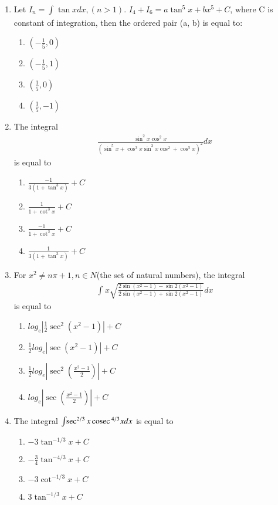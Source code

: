 \begin{enumerate}[label=\arabic*.,ref=\thesubsection.\theenumi]
\item Let $I_n = \int_{}\tan xdx,(n > 1)$. $I_4 + I_6 = a\tan^{5}x + bx^5 + C$, where C is constant of integration, then the ordered pair (a, b) is equal to:
\begin{enumerate}
\item $(-\frac{1}{5}, 0)$
\item $(-\frac{1}{5}, 1)$
\item $(\frac{1}{5}, 0)$
\item $(\frac{1}{5}, -1)$
\end{enumerate}

\item The integral
\begin{align*}
\frac{\sin^{2}x \cos^{2}x}{(\sin^{5}x + \cos^{3}x\sin^{3}x\cos^{2} + \cos^{5}x)^2}dx
\end{align*}
is equal to
\begin{enumerate}
\item $\frac{-1}{3(1 + \tan^{3}x)} + C$
\item $\frac{1}{1 + \cot^{3}x} + C$
\item $\frac{-1}{1 + \cot^{3}x} + C$
\item $\frac{1}{3(1 + \tan^{3}x)} + C$
\end{enumerate}

\item For $x^2 \neq n\pi + 1, n \in N$(the set of natural numbers), the integral
\begin{align*}
\int_{}x \sqrt{\frac{2\sin(x^2 - 1) - \sin 2(x^2 - 1)}{2\sin(x^2 - 1) + \sin 2(x^2 - 1)}}dx
\end{align*}
is equal to
\begin{enumerate}
\item $log_e|\frac{1}{2}\sec^{2}(x^2 - 1)| + C$
\item $\frac{1}{2}log_e|\sec(x^2 - 1)| + C$
\item $\frac{1}{2}log_e|\sec^{2}(\frac{x^2 - 1}{2})| + C$
\item $log_e|\sec(\frac{x^2 - 1}{2})| + C$
\end{enumerate}

\item The integral $\int_{}\sec^{2/3}x\,\text{cosec}\,^{4/3}xdx$ is equal to
\begin{enumerate}
\item $-3\tan^{-1/3}x + C$
\item $-\frac{3}{4}\tan^{-4/3}x + C$
\item $-3\cot^{-1/3}x + C$
\item $3\tan^{-1/3}x + C$
\end{enumerate}
\end{enumerate}








